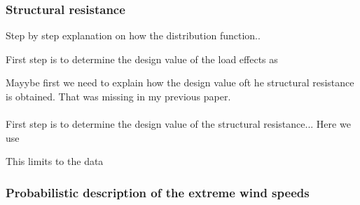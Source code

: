\subsubsection{Structural resistance}
Step by step explanation on how the distribution function..

First step is to determine the design value of the load effects as 

Mayybe first we need to explain how the design value oft he structural resistance is obtained. That was missing in my previous paper. \\
\\
First step is to determine the design value of the structural resistance... Here we use




This limits to the data
\subsubsection{Probabilistic description of the extreme wind speeds}
